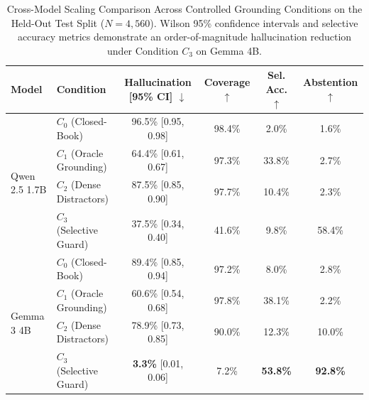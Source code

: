 \begin{table}[t]
\centering
\small
\setlength{\tabcolsep}{4.5pt}
\begin{tabular}{llcccc}
\toprule
\textbf{Model} & \textbf{Condition} & \textbf{Hallucination [95\% CI] $\downarrow$} & \textbf{Coverage $\uparrow$} & \textbf{Sel. Acc. $\uparrow$} & \textbf{Abstention $\uparrow$} \\
\midrule
\multirow{4}{*}{Qwen 2.5 1.7B}
& $C_0$ (Closed-Book)       & 96.5\% [0.95, 0.98] & 98.4\% & \phantom{0}2.0\% & \phantom{0}1.6\% \\
& $C_1$ (Oracle Grounding)  & 64.4\% [0.61, 0.67] & 97.3\% & 33.8\%           & \phantom{0}2.7\% \\
& $C_2$ (Dense Distractors) & 87.5\% [0.85, 0.90] & 97.7\% & 10.4\%           & \phantom{0}2.3\% \\
& $C_3$ (Selective Guard)   & 37.5\% [0.34, 0.40] & 41.6\% & \phantom{0}9.8\% & 58.4\% \\
\midrule
\multirow{4}{*}{Gemma 3 4B}
& $C_0$ (Closed-Book)       & 89.4\% [0.85, 0.94] & 97.2\% & \phantom{0}8.0\% & \phantom{0}2.8\% \\
& $C_1$ (Oracle Grounding)  & 60.6\% [0.54, 0.68] & 97.8\% & 38.1\%           & \phantom{0}2.2\% \\
& $C_2$ (Dense Distractors) & 78.9\% [0.73, 0.85] & 90.0\% & 12.3\%           & 10.0\% \\
& $C_3$ (Selective Guard)   & \textbf{3.3\%} [0.01, 0.06] & \phantom{0}7.2\% & \textbf{53.8\%} & \textbf{92.8\%} \\
\bottomrule
\end{tabular}
\caption{Cross-Model Scaling Comparison Across Controlled Grounding Conditions on the Held-Out Test Split ($N=4{,}560$). Wilson 95\% confidence intervals and selective accuracy metrics demonstrate an order-of-magnitude hallucination reduction under Condition $C_3$ on Gemma 4B.}
\label{tab:model_scaling_comparison}
\end{table}
